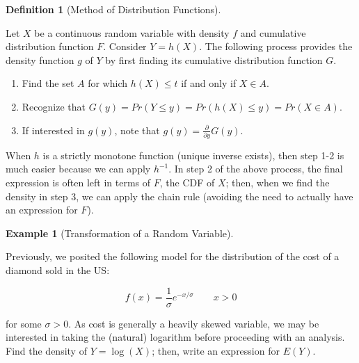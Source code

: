 \documentclass[
  letterpaper,
  DIV=11,
  numbers=noendperiod]{scrreprt}
\providecommand{\tightlist}{%
  \setlength{\itemsep}{0pt}\setlength{\parskip}{0pt}}\usepackage{longtable,booktabs,array}
\theoremstyle{definition}
\newtheorem{example}{Example}[chapter]
\theoremstyle{definition}
\newtheorem{definition}{Definition}[chapter]
\theoremstyle{plain}
\theoremstyle{remark}
\begin{document}
\begin{definition}[Method of Distribution
Functions]\protect\hypertarget{def-method-of-distribution-functions}{}\label{def-method-of-distribution-functions}

Let \(X\) be a continuous random variable with density \(f\) and
cumulative distribution function \(F\). Consider \(Y = h(X)\). The
following process provides the density function \(g\) of \(Y\) by first
finding its cumulative distribution function \(G\).

\begin{enumerate}
\def\labelenumi{\arabic{enumi}.}
\tightlist
\item
  Find the set \(A\) for which \(h(X) \leq t\) if and only if
  \(X \in A\).
\item
  Recognize that
  \(G(y) = Pr(Y \leq y) = Pr\left(h(X) \leq y\right) = Pr(X \in A)\).
\item
  If interested in \(g(y)\), note that
  \(g(y) = \frac{\partial}{\partial y} G(y)\).
\end{enumerate}

\end{definition}

When \(h\) is a strictly monotone function (unique inverse exists), then
step 1-2 is much easier because we can apply \(h^{-1}\). In step 2 of
the above process, the final expression is often left in terms of \(F\),
the CDF of \(X\); then, when we find the density in step 3, we can apply
the chain rule (avoiding the need to actually have an expression for
\(F\)).

\begin{example}[Transformation of a Random
Variable]\protect\hypertarget{exm-transformations}{}\label{exm-transformations}

Previously, we posited the following model for the distribution of the
cost of a diamond sold in the US:

\[f(x) = \frac{1}{\sigma} e^{-x/\sigma} \qquad x > 0\]

for some \(\sigma > 0\). As cost is generally a heavily skewed variable,
we may be interested in taking the (natural) logarithm before proceeding
with an analysis. Find the density of \(Y = \log(X)\); then, write an
expression for \(E(Y)\).

\end{example}
\end{document}
